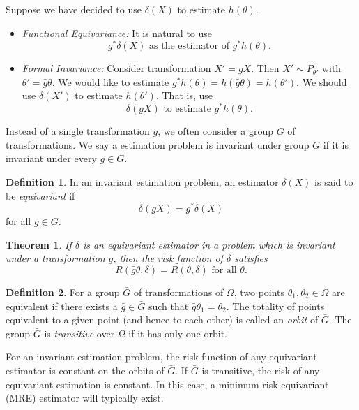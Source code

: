 \documentclass{article}
\theoremstyle{plain}
\newtheorem{theorem}{Theorem}
\theoremstyle{definition}
\newtheorem{definition}{Definition}
\begin{document}
Suppose we have decided to use $\delta(X)$ to estimate $h(\theta)$.
\begin{itemize}
\item
\emph{Functional Equivariance:}  It is natural to use
\begin{equation*}
g^*\delta(X)\textrm{ as the estimator of } g^* h(\theta).
\end{equation*}
\item
    \emph{Formal Invariance:} Consider transformation $X'=gX$.
        Then $X'\sim P_{\theta'}$ with $\theta'=\bar{g}\theta$. We would like to estimate $g^*h(\theta)=h(\bar{g}\theta)=h(\theta')$. We should use $\delta(X')$ to estimate $h(\theta')$. That is, use
        \begin{equation*}
            \delta(gX)\textrm{ to estimate } g^*h(\theta).
        \end{equation*}
\end{itemize}

Instead of a single transformation $g$, we often consider a group $G$ of transformations.
We say a estimation problem is invariant under group $G$ if it is invariant under every $g\in G$.
\begin{definition}
    In an invariant estimation problem, an estimator $\delta(X)$ is said to be \emph{equivariant} if 
    \begin{equation*}
        \delta(gX)=g^*\delta(X)
    \end{equation*}
    for all $g\in G$.
\end{definition}
\begin{theorem}
    If $\delta$ is an equivariant estimator in a problem which is invariant under a transformation $g$, then the risk function of $\delta$ satisfies
    \begin{equation*}
        \textrm{$R(\bar{g}\theta,\delta)=R(\theta,\delta)$ for all $\theta$.}
    \end{equation*}
\end{theorem}
\begin{definition}
    For a group $\bar{G}$ of transformations of $\Omega$, two points $\theta_1,\theta_2\in \Omega$ are equivalent if there exists a $\bar{g}\in\bar{G}$ such that $\bar{g}\theta_1=\theta_2$.
    The totality of points equivalent to a given point (and hence to each other) is called an \emph{orbit} of $\bar{G}$. The group $\bar{G}$ is \emph{transitive} over $\Omega$ if it has only one orbit.
\end{definition}
For an invariant estimation problem, the risk function of any equivariant estimator is constant on the orbits of $\bar{G}$.
 If $\bar{G}$ is transitive, the risk of any equivariant estimation is constant.
In this case, a minimum risk equivariant (MRE) estimator will typically exist.
\end{document}
